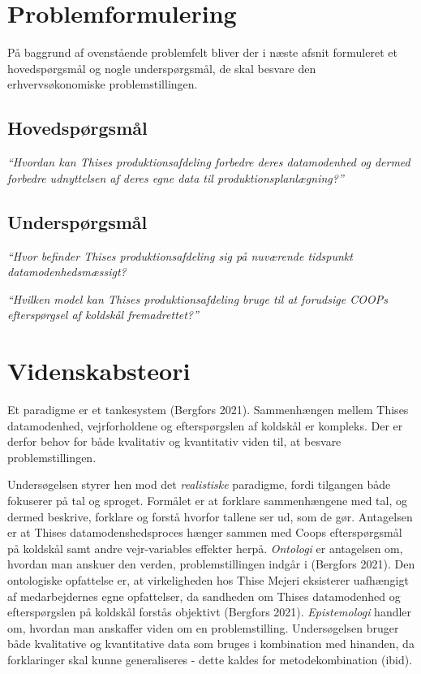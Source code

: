\documentclass[
  12pt,
  a4paper,
  DIV=11,
  numbers=noendperiod]{scrartcl}
\begin{document}
\hypertarget{problemformulering}{%
\section{Problemformulering}\label{problemformulering}}

På baggrund af ovenstående problemfelt bliver der i næste afsnit
formuleret et hovedspørgsmål og nogle underspørgsmål, de skal besvare
den erhvervsøkonomiske problemstillingen.

\hypertarget{hovedspuxf8rgsmuxe5l}{%
\subsection{Hovedspørgsmål}\label{hovedspuxf8rgsmuxe5l}}

\emph{``Hvordan kan Thises produktionsafdeling forbedre deres
datamodenhed og dermed forbedre udnyttelsen af deres egne data til
produktionsplanlægning?''}

\hypertarget{underspuxf8rgsmuxe5l}{%
\subsection{Underspørgsmål}\label{underspuxf8rgsmuxe5l}}

\emph{``Hvor befinder Thises produktionsafdeling sig på nuværende
tidspunkt datamodenhedsmæssigt?}

\emph{``Hvilken model kan Thises produktionsafdeling bruge til at
forudsige COOPs efterspørgsel af koldskål fremadrettet?''}

\hypertarget{videnskabsteori}{%
\section{Videnskabsteori}\label{videnskabsteori}}

Et paradigme er et tankesystem (Bergfors 2021). Sammenhængen mellem
Thises datamodenhed, vejrforholdene og efterspørgslen af koldskål er
kompleks. Der er derfor behov for både kvalitativ og kvantitativ viden
til, at besvare problemstillingen.

Undersøgelsen styrer hen mod det \emph{realistiske} paradigme, fordi
tilgangen både fokuserer på tal og sproget. Formålet er at forklare
sammenhængene med tal, og dermed beskrive, forklare og forstå hvorfor
tallene ser ud, som de gør. Antagelsen er at Thises datamodenshedsproces
hænger sammen med Coops efterspørgsmål på koldskål samt andre
vejr-variables effekter herpå. \emph{Ontologi} er antagelsen om, hvordan
man anskuer den verden, problemstillingen indgår i (Bergfors 2021). Den
ontologiske opfattelse er, at virkeligheden hos Thise Mejeri eksisterer
uafhængigt af medarbejdernes egne opfattelser, da sandheden om Thises
datamodenhed og efterspørgslen på koldskål forstås objektivt (Bergfors
2021). \emph{Epistemologi} handler om, hvordan man anskaffer viden om en
problemstilling. Undersøgelsen bruger både kvalitative og kvantitative
data som bruges i kombination med hinanden, da forklaringer skal kunne
generaliseres - dette kaldes for metodekombination (ibid).
\end{document}
